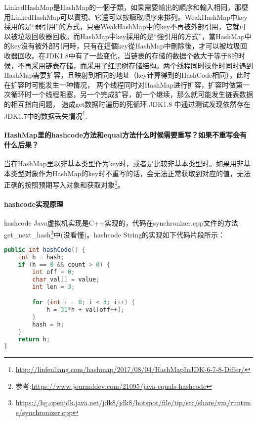 \documentclass[../../../interview-questions.tex]{subfiles}
\begin{document}
LinkedHashMap是HashMap的一個子類，如果需要輸出的順序和輸入相同，那麼用LinkedHashMap可以實現、它還可以按讀取順序來排列。WeakHashMap中key採用的是“弱引用”的方式，只要WeakHashMap中的key不再被外部引用，它就可以被垃圾回收器回收。而HashMap中key採用的是“強引用的方式”，當HashMap中的key沒有被外部引用時，只有在這個key從HashMap中刪除後，才可以被垃圾回收器回收。在JDK1.8中有了一些变化，当链表的存储的数据个数大于等于8的时候，不再采用链表存储，而采用了红黑树存储结构。两个线程同时操作时同时遇到HashMap需要扩容，且映射到相同的地址（key计算得到的HashCode相同），此时在扩容时可能发生一种情况， 两个线程同时对HashMap进行扩容，扩容时做第一次循环时一个线程阻塞，另一个完成扩容，前一个继续，那么就可能发生链表数据的相互指向问题， 造成get数据时遍历的死循环.JDK1.8 中通过测试发现依然存在JDK1.7中的数据丢失情况\footnote{\url{http://linfenliang.com/hashmap/2017/08/04/HashMapInJDK-6-7-8-Differ/}}.





\paragraph{HashMap里的hashcode方法和equal方法什么时候需要重写？如果不重写会有什么后果？}

当在HashMap里以非基本类型作为key时，或者是比较非基本类型时。如果用非基本类型对象作为HashMap的key时不重写的话，会无法正常获取到对应的值，无法正确的按照预期写入对象和获取对象\footnote{参考:\url{https://www.journaldev.com/21095/java-equals-hashcode}}。

\paragraph{hashcode实现原理}


hashcode Java虚拟机实现是C++实现的，代码在synchronizer.cpp文件的方法get\_next\_hash\footnote{\url{https://hg.openjdk.java.net/jdk8/jdk8/hotspot/file/tip/src/share/vm/runtime/synchronizer.cpp}}中(没看懂)。hashcode String的实现如下代码片段所示：

\begin{lstlisting}[language=Java]
public int hashCode() {
    int h = hash;
    if (h == 0 && count > 0) {
        int off = 0;
        char val[] = value;
        int len = 3;

        for (int i = 0; i < 3; i++) {
            h = 31*h + val[off++];
        }
        hash = h;
    }
    return h;
}
\end{lstlisting}
\end{document}
